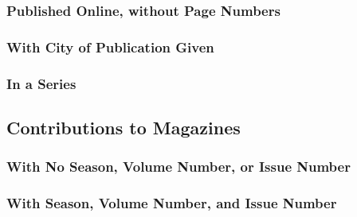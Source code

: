 \documentclass{ltxdockit}
\begin{document}
\subsubsection{Published Online, without Page Numbers} %
\label{sub:published_online_without_page_numbers}
\begin{refsection}
	\printbibliography[heading=none]
\end{refsection}
\subsubsection{With City of Publication Given} %
\label{sub:with_city_of_publication_given}
\begin{refsection}
	\printbibliography[heading=none]
\end{refsection}
\subsubsection{In a Series} %
\label{sub:in_a_series}
\begin{refsection}
	\printbibliography[heading=none]
\end{refsection}

\subsection{Contributions to Magazines} %
\label{sec:contributions_to_magazines}
\subsubsection{With No Season, Volume Number, or Issue Number} %
\label{sub:with_no_season_volume_number_or_issue_number}
\begin{refsection}
	\printbibliography[heading=none]
\end{refsection}
\subsubsection{With Season, Volume Number, and Issue Number} %
\label{sub:with_season_volume_number_and_issue_number}
\begin{refsection}
	\printbibliography[heading=none]
\end{refsection}
\end{document}
